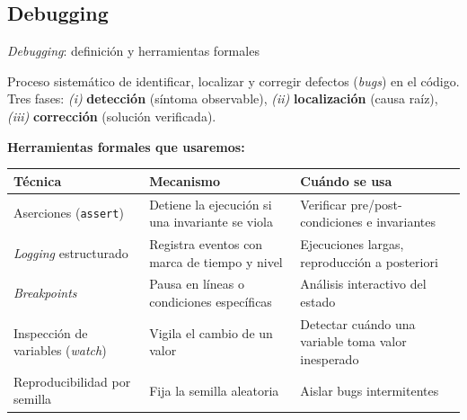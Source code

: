 \documentclass[aspectratio=1610, 10pt]{beamer}
\begin{document}
\subsection{Debugging}

\begin{frame}{\emph{Debugging}: definición y herramientas formales}
  \begin{definicionbox}
    \footnotesize
    Proceso sistemático de identificar, localizar y corregir defectos
    (\emph{bugs}) en el código. Tres fases:
    \emph{(i)} \textbf{detección} (síntoma observable),
    \emph{(ii)} \textbf{localización} (causa raíz),
    \emph{(iii)} \textbf{corrección} (solución verificada).
  \end{definicionbox}

  \vspace{4pt}
  \footnotesize
  \textbf{Herramientas formales que usaremos:}
  \begin{center}\scriptsize
    \renewcommand{\arraystretch}{1.2}
    \begin{tabular}{p{3.2cm} p{4.6cm} p{6.0cm}}
      \toprule
      \textbf{Técnica} & \textbf{Mecanismo} & \textbf{Cuándo se usa} \\
      \midrule
      Aserciones (\texttt{assert})
        & Detiene la ejecución si una invariante se viola
        & Verificar pre/post-condiciones e invariantes \\
      \emph{Logging} estructurado
        & Registra eventos con marca de tiempo y nivel
        & Ejecuciones largas, reproducción a posteriori \\
      \emph{Breakpoints}
        & Pausa en líneas o condiciones específicas
        & Análisis interactivo del estado \\
      Inspección de variables (\emph{watch})
        & Vigila el cambio de un valor
        & Detectar cuándo una variable toma valor inesperado \\
      Reproducibilidad por semilla
        & Fija la semilla aleatoria
        & Aislar bugs intermitentes \\
      \bottomrule
    \end{tabular}
  \end{center}
\end{frame}
\end{document}
